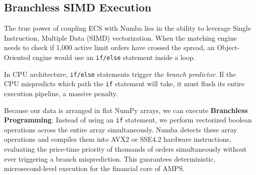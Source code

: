 \subsection{Branchless SIMD Execution}

The true power of coupling ECS with Numba lies in the ability to leverage Single Instruction, Multiple Data (SIMD) vectorization. When the matching engine needs to check if 1,000 active limit orders have crossed the spread, an Object-Oriented engine would use an \texttt{if/else} statement inside a loop.

In CPU architecture, \texttt{if/else} statements trigger the \textit{branch predictor}. If the CPU mispredicts which path the \texttt{if} statement will take, it must flush its entire execution pipeline, a massive penalty. 

Because our data is arranged in flat NumPy arrays, we can execute \textbf{Branchless Programming}. Instead of using an \texttt{if} statement, we perform vectorized boolean operations across the entire array simultaneously. Numba detects these array operations and compiles them into AVX2 or SSE4.2 hardware instructions, evaluating the price-time priority of thousands of orders simultaneously without ever triggering a branch misprediction. This guarantees deterministic, microsecond-level execution for the financial core of AMPS.
